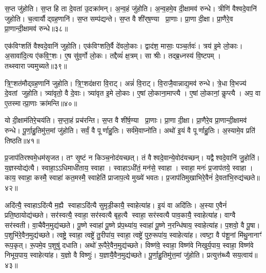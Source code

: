 स॒प्त जु॑होति।
स॒प्त हि ता दे॒वता॑ उ॒दक्रा॑मन्।
अ॒न्व॒हं जु॑होति।
अ॒न्व॒हमे॒व दी॒क्षामव॑ रुन्धे।
त्रीणि॑ वैश्वदे॒वानि॑ जुहोति।
च॒त्वार्यौद्ग्रह॒णानि॑।
स॒प्त सम्प॑द्यन्ते।
स॒प्त वै शी॑र्‌\mbox{}ष॒ण्या प्रा॒णाः।
प्रा॒णा दी॒क्षा।
प्रा॒णैरे॒व प्रा॒णान्दी॒क्षामव॑ रुन्धे॥३८॥

एक॑विꣳशतिं वैश्वदे॒वानि॑ जुहोति।
एक॑विꣳशति॒र्वै दे॑वलो॒काः।
द्वाद॑श॒ मासाः॒ पञ्च॒र्तवः॑।
त्रय॑ इ॒मे लो॒काः।
अ॒सावा॑दि॒त्य ए॑कवि॒ꣳ॒शः।
ए॒ष सु॑व॒र्गो लो॒कः।
तद्दैव्यं॑ क्ष॒त्रम्।
सा श्रीः।
तद्ब्र॒ध्नस्य॑ वि॒ष्टपम्।
तथ्स्वाराज्यमुच्यते॥३९॥

त्रि॒ꣳ॒शत॑मौद्ग्रह॒णानि॑ जुहोति।
त्रि॒ꣳ॒शद॑क्षरा वि॒राट्।
अन्नं॑ वि॒राट्।
वि॒राजै॒वान्नाद्य॒मव॑ रुन्धे।
त्रे॒धा वि॒भज्य॑ दे॒वतां जुहोति।
त्र्या॑वृतो॒ वै दे॒वाः।
त्र्या॑वृत इ॒मे लो॒काः।
ए॒षां लो॒काना॒माप्त्यै।
ए॒षां लो॒कानां॒ कॢप्त्यै।
अप॒ वा ए॒तस्मात्प्रा॒णाः क्रा॑मन्ति॥४०॥

यो दी॒क्षाम॑तिरे॒चय॑ति।
स॒प्ता॒हं प्रच॑रन्ति।
स॒प्त वै शी॑र्\mbox{}ष॒ण्या प्रा॒णाः।
प्रा॒णा दी॒क्षा।
प्रा॒णैरे॒व प्रा॒णान्दी॒क्षामव॑ रुन्धे।
पू॒र्णा॒हु॒तिमु॑त्त॒मां जु॑होति।
सर्वं॒ वै पूर्णाहु॒तिः।
सर्व॑मे॒वाप्नो॑ति।
अथो॑ इ॒यं वै पूर्णाहु॒तिः।
अ॒स्यामे॒व प्रति॑ तिष्ठति॥४१॥\anuvakamend[रु॒न्धे॒ प्रा॒णान्दी॒क्षामव॑ रुन्ध उच्यते क्रामन्ति तिष्ठति]

प्र॒जाप॑तिरश्वमे॒धम॑सृजत।
तꣳ सृ॒ष्टं न किञ्च॒नोद॑यच्छत्।
तं वैश्वदे॒वान्ये॒वोद॑यच्छन्।
यद्वैश्वदे॒वानि॑ जु॒होति॑।
य॒ज्ञस्योद्य॑त्यै।
स्वाहा॒\-ऽऽधिमाधी॑ताय॒ स्वाहा।
स्वाहा\-ऽधी॑तं॒ मन॑से॒ स्वाहा।
स्वाहा॒ मनः॑ प्र॒जाप॑तये॒ स्वाहा।
काय॒ स्वाहा॒ कस्मै॒ स्वाहा॑ कत॒मस्मै॒ स्वाहेति॑ प्राजाप॒त्ये मुख्ये॑ भवतः।
प्र॒जाप॑तिमुखाभिरे॒वैनं॑ दे॒वता॑भि॒रुद्य॑च्छते॥४२॥

अदि॑त्यै॒ स्वाहा\-ऽदि॑त्यै म॒ह्यै स्वाहा\-ऽदि॑त्यै सुमृडी॒कायै॒ स्वाहेत्या॑ह।
इ॒यं वा अदि॑तिः।
अ॒स्या ए॒वैनं॑ प्रति॒ष्ठायोद्य॑च्छते।
सर॑स्वत्यै॒ स्वाहा॒ सर॑स्वत्यै बृह॒त्यै स्वाहा॒ सर॑स्वत्यै पाव॒कायै॒ स्वाहेत्या॑ह।
वाग्वै सर॑स्वती।
वा॒चैवैन॒मुद्य॑च्छते।
पू॒ष्णे स्वाहा॑ पू॒ष्णे प्र॑प॒थ्या॑य॒ स्वाहा॑ पू॒ष्णे न॒रन्धि॑षाय॒ स्वाहेत्या॑ह।
प॒शवो॒ वै पू॒षा।
प॒शुभि॑रे॒वैन॒मुद्य॑च्छते।
त्वष्ट्रे॒ स्वाहा॒ त्वष्ट्रे॑ तु॒रीपा॑य॒ स्वाहा॒ त्वष्ट्रे॑ पुरु॒रूपा॑य॒ स्वाहेत्या॑ह।
त्वष्टा॒ वै प॑शू॒नां मि॑थु॒नानाꣳ॑ रूप॒कृत्।
रू॒पमे॒व प॒शुषु॑ दधाति।
अथो॑ रू॒पैरे॒वैन॒मुद्य॑च्छते।
विष्ण॑वे॒ स्वाहा॒ विष्ण॑वे निखुर्य॒पाय॒ स्वाहा॒ विष्ण॑वे निभूय॒पाय॒ स्वाहेत्या॑ह।
य॒ज्ञो वै विष्णुः॑।
य॒ज्ञायै॒वैन॒मुद्य॑च्छते।
पू॒र्णा॒हु॒तिमु॑त्त॒मां जु॑होति।
प्रत्युत्त॑ब्ध्यै सय॒त्वाय॑॥४३॥\anuvakamend[य॒च्छ॒ते॒ पु॒रु॒रूपा॑य॒ स्वाहेत्या॑हा॒ष्टौ च॑]

